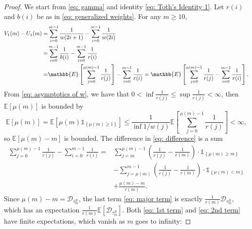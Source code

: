 \documentclass[EJP]{ejpecp} %
\begin{document}
\begin{proof} 
	We start from \eqref{eq: gamma} and identity \eqref{eq: Toth's Identity 1}. 
	Let $r(i)$ and $b(i)$ be as in \eqref{eq: generalized weights}.
	For any $m \geq 10$,
	\begin{align}
		V_1(m) - U_1(m) =& \sum_{i=0}^{m-1} \frac{1}{w(2i+1)} -\sum_{i=0}^{m-1} \frac{1}{w(2i)} 
		\notag \\
		=& \sum_{i=0}^{m-1} \frac{1}{b(i)} -\sum_{i=0}^{m-1} \frac{1}{r(i)} 
		\notag \\
		=& 	\mathbb{E}\left[  \sum_{j=0}^{ \mu(m)-1 } \frac{1}{r(j)}   \right] - \sum_{i=0}^{m-1} \frac{1}{r(i)} = \mathbb{E}\left[  \sum_{j=0}^{ \mu(m)-1 } \frac{1}{r(j)}    - \sum_{i=0}^{m-1} \frac{1}{r(i)}\right]. \label{eq: difference}
	\end{align}
	From \eqref{eq: asymptotics of w}, we have that $0< \inf \frac{1}{r(j)} \leq \sup \frac{1}{r(j)} <\infty $, then $\mathbb{E}\left[\mu(m)\right]$ is bounded by
	$$\mathbb{E}\left[ \mu(m) \right] = \mathbb{E}\left[ \mu(m)\mathbb{1}_{\left\{\mu(m)\geq 1 \right\} } \right] \leq  \frac{1}{\inf 1/w(j) }\mathbb{E}\left[  \sum_{j=0}^{ \mu(m)-1 } \frac{1}{r(j)}   \right] <\infty, $$ 
	so $ \mathbb{E}\left[ \mu(m) -m\right]  $ is bounded.
	The difference in \eqref{eq: difference} is a sum
	\begin{align} 
		\sum_{j=0}^{ \mu(m)-1 } \frac{1}{r(j)} - \sum_{i=0}^{m-1} \frac{1}{r(i)} =& \sum_{j=m}^{\mu(m)-1} \left(\frac{1}{r(j)} -\frac{1}{r(m)} \right) \cdot\mathbb{1}_{\left\{\mu(m)\geq m\right\}} 
		\label{eq: 1st term}
		\\	
		& - \sum_{j=\mu(m)}^{m-1} \left(\frac{1}{r(j)} -\frac{1}{r(m)} \right) \cdot \mathbb{1}_{\left\{\mu(m)< m\right\}} 
		\label{eq: 2nd term}
		\\
		& + \frac{\mu(m)-m}{ r(m) }. \label{eq: major term}
	\end{align} 
	Since $\mu(m)-m = \mathscr{D}_{\tau^{\mathscr{B}}_m}$, the last term \eqref{eq: major term} is exactly $\frac{1}{r(m)} \mathscr{D}_{\tau^{\mathscr{B}}_m}$, which has an expectation $\frac{1}{r(m)} \mathbb{E}\left[\mathscr{D}_{\tau^{\mathscr{B}}_m}\right].$ Both \eqref{eq: 1st term} and \eqref{eq: 2nd term} have finite expectations, which vanish as $m$ goes to infinity:
	

\end{proof}
\end{document}
